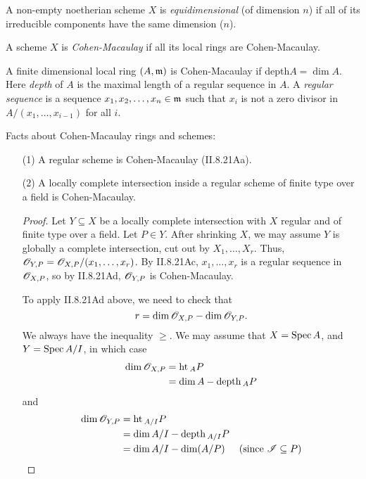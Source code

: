  \begin{definition} A non-empty noetherian scheme $X$ is
 \emph{equidimensional} (of dimension $n$) if all of its
 irreducible components have the same dimension ($n$).
 \end{definition}

 \begin{definition}
 A scheme $X$ is \emph{Cohen-Macaulay} if all its local rings are
 Cohen-Macaulay.
 \end{definition}

 A finite dimensional local ring $(A,\mathfrak{m})$ is Cohen-Macaulay if
 depth$A=\dim A$.  Here \emph{depth} of $A$ is the maximal length
 of a regular sequence in $A$.  A \emph{regular sequence} is a
 sequence $x_1,x_2,\dots, x_n\in \mathfrak{m}$ such that $x_i$ is not a
 zero divisor in $A/(x_1,\dots,x_{i-1})$ for all $i$.

 Facts about Cohen-Macaulay rings and schemes:
 \begin{itemize}
  \item[(1)] A regular scheme is Cohen-Macaulay (II.8.21Aa).
  \item[(2)] A locally complete intersection inside a regular
  scheme of finite type over a field is Cohen-Macaulay.
  \begin{proof}
   Let $Y\subseteq X$ be a locally complete intersection with $X$
   regular and of finite type over a field.  Let $P\in Y$.  After
   shrinking $X$, we may assume $Y$ is globally a complete
   intersection, cut out by $X_1,\dots, X_r$.  Thus, $\mathscr{O}_{Y,P} =
   \mathscr{O}_{X,P}/(x_1,\dots, x_r)$.  By II.8.21Ac, $x_1,\dots, x_r$ is
   a regular sequence in $\mathscr{O}_{X,P}$, so by II.8.21Ad, $\mathscr{O}_{Y,P}$
   is Cohen-Macaulay.

   To apply II.8.21Ad above, we need to check that
   \[
    r = \dim \mathscr{O}_{X,P} - \dim \mathscr{O}_{Y,P}.
   \]
   We always have the inequality $\ge$.  We may assume that
   $X=\text{\rm Spec\,} A$, and $Y=\text{\rm Spec\,} A/I$, in which case
   \begin{align*}
    \dim \mathscr{O}_{X,P} &= \text{\rm ht}\,_A P \\
        &= \dim A - \text{\rm depth}\,_A P\\
   \end{align*}
   and
   \begin{align*}
    \dim \mathscr{O}_{Y,P} &= \text{\rm ht}\,_{A/I} P \\
        &= \dim A/I - \text{\rm depth}\,_{A/I} P\\
        &= \dim A/I - \dim(A/P) & \text{(since $\mathscr{I}\subseteq P$)}
   \end{align*}
   \end{proof}
  \end{itemize}
